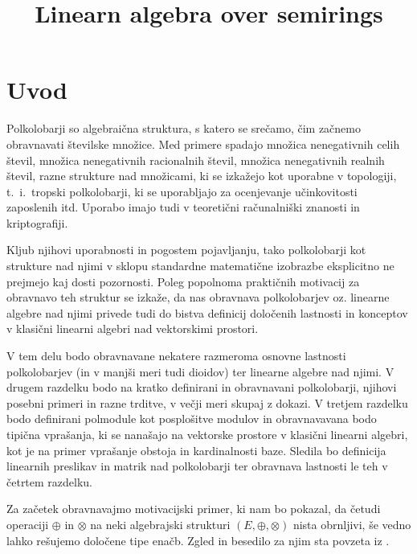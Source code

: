 \documentclass[mat1]{fmfdelo}
\title{Linearn algebra over semirings}
\begin{document}

\tableofcontents

\section{Uvod}
Polkolobarji so algebraična struktura, s katero se srečamo, čim začnemo obravnavati številske množice. Med primere spadajo množica nenegativnih celih števil, množica nenegativnih racionalnih števil, množica nenegativnih realnih števil, razne strukture nad množicami, ki se izkažejo kot uporabne v topologiji, t.~i.~tropski polkolobarji, ki se uporabljajo za ocenjevanje učinkovitosti zaposlenih itd. Uporabo imajo tudi v teoretični računalniški znanosti in kriptografiji. 

Kljub njihovi uporabnosti in pogostem pojavljanju, tako polkolobarji kot strukture nad njimi v sklopu standardne matematične izobrazbe eksplicitno ne prejmejo kaj dosti pozornosti. Poleg popolnoma praktičnih motivacij za obravnavo teh struktur se izkaže, da nas obravnava polkolobarjev oz. linearne algebre nad njimi privede tudi do bistva definicij določenih lastnosti in konceptov v klasični linearni algebri nad vektorskimi prostori. 

V tem delu bodo obravnavane nekatere razmeroma osnovne lastnosti polkolobarjev (in v manjši meri tudi dioidov) ter linearne algebre nad njimi. V drugem razdelku bodo na kratko definirani in obravnavani polkolobarji, njihovi posebni primeri in razne trditve, v večji meri skupaj z dokazi. V tretjem razdelku bodo definirani polmodule kot posplošitve modulov in obravnavavana bodo tipična vprašanja, ki se nanašajo na vektorske prostore v klasični linearni algebri, kot je na primer vprašanje obstoja in kardinalnosti baze. Sledila bo definicija linearnih preslikav in matrik nad polkolobarji ter obravnava lastnosti le teh v četrtem razdelku.

Za začetek obravnavajmo motivacijski primer, ki nam bo pokazal, da četudi operaciji $\oplus$ in $\otimes$ na neki algebrajski strukturi $(E, \oplus, \otimes)$ nista obrnljivi, še vedno lahko rešujemo določene tipe enačb. Zgled in besedilo za njim sta povzeta iz \cite[str. 1--2]{bib:Gondran} .
\end{document}
